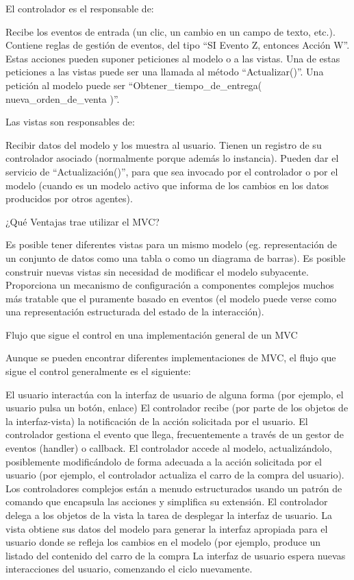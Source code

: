 El controlador es el responsable de:

    Recibe los eventos de entrada (un clic, un cambio en un campo de texto, etc.).
    Contiene reglas de gestión de eventos, del tipo “SI Evento Z, entonces Acción W”. Estas acciones pueden suponer peticiones al 
    modelo o a las vistas. Una de estas peticiones a las vistas puede ser una llamada al método “Actualizar()”. Una petición al modelo 
    puede ser “Obtener_tiempo_de_entrega( nueva_orden_de_venta )”.

Las vistas son responsables de:

    Recibir datos del modelo y los muestra al usuario.
    Tienen un registro de su controlador asociado (normalmente porque además lo instancia).
    Pueden dar el servicio de “Actualización()”, para que sea invocado por el controlador o por el modelo (cuando es un modelo activo que 
    informa de los cambios en los datos producidos por otros agentes).

¿Qué Ventajas trae utilizar el MVC?

    Es posible tener diferentes vistas para un mismo modelo (eg. representación de un conjunto de datos como una tabla o como un diagrama 
    de barras).
    Es posible construir nuevas vistas sin necesidad de modificar el modelo subyacente.
    Proporciona un mecanismo de configuración a componentes complejos muchos más tratable que el puramente basado en eventos (el modelo 
    puede verse como una representación estructurada del estado de la interacción).
    

Flujo que sigue el control en una implementación general de un MVC

Aunque se pueden encontrar diferentes implementaciones de MVC, el flujo que sigue el control generalmente es el siguiente:

    El usuario interactúa con la interfaz de usuario de alguna forma (por ejemplo, el usuario pulsa un botón, enlace)
    El controlador recibe (por parte de los objetos de la interfaz-vista) la notificación de la acción solicitada por el usuario. 
      El controlador gestiona el evento que llega, frecuentemente a través de un gestor de eventos (handler) o callback.
    El controlador accede al modelo, actualizándolo, posiblemente modificándolo de forma adecuada a la acción solicitada por el usuario 
      (por ejemplo, el controlador actualiza el carro de la compra del usuario). Los controladores complejos están a menudo estructurados 
      usando un patrón de comando que encapsula las acciones y simplifica su extensión.
    El controlador delega a los objetos de la vista la tarea de desplegar la interfaz de usuario. La vista obtiene sus datos del modelo 
      para generar la interfaz apropiada para el usuario donde se refleja los cambios en el modelo (por ejemplo, produce un listado del 
      contenido del carro de la compra
    La interfaz de usuario espera nuevas interacciones del usuario, comenzando el ciclo nuevamente.

